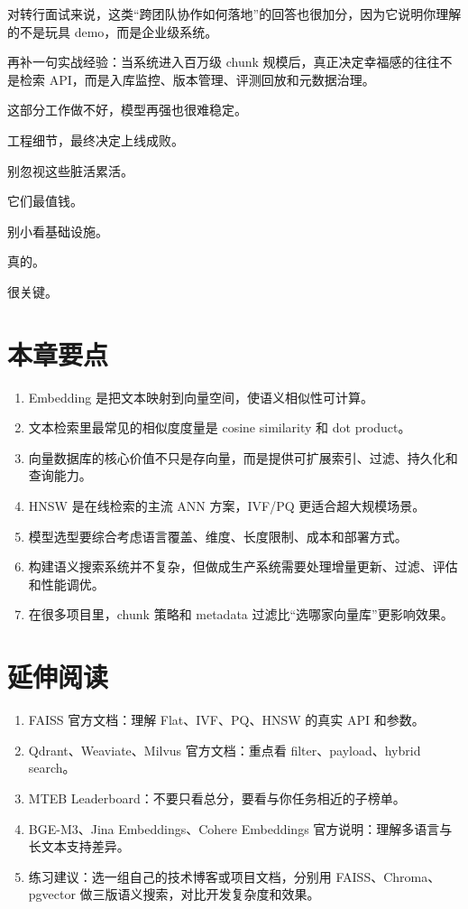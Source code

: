 对转行面试来说，这类``跨团队协作如何落地''的回答也很加分，因为它说明你理解的不是玩具 demo，而是企业级系统。

再补一句实战经验：当系统进入百万级 chunk 规模后，真正决定幸福感的往往不是检索 API，而是入库监控、版本管理、评测回放和元数据治理。

这部分工作做不好，模型再强也很难稳定。

工程细节，最终决定上线成败。

别忽视这些脏活累活。

它们最值钱。

别小看基础设施。

真的。

很关键。


\section{本章要点}

\begin{enumerate}[leftmargin=2em]
\item Embedding 是把文本映射到向量空间，使语义相似性可计算。
\item 文本检索里最常见的相似度度量是 cosine similarity 和 dot product。
\item 向量数据库的核心价值不只是存向量，而是提供可扩展索引、过滤、持久化和查询能力。
\item HNSW 是在线检索的主流 ANN 方案，IVF/PQ 更适合超大规模场景。
\item 模型选型要综合考虑语言覆盖、维度、长度限制、成本和部署方式。
\item 构建语义搜索系统并不复杂，但做成生产系统需要处理增量更新、过滤、评估和性能调优。
\item 在很多项目里，chunk 策略和 metadata 过滤比``选哪家向量库''更影响效果。
\end{enumerate}

\section{延伸阅读}

\begin{enumerate}[leftmargin=2em]
\item FAISS 官方文档：理解 Flat、IVF、PQ、HNSW 的真实 API 和参数。
\item Qdrant、Weaviate、Milvus 官方文档：重点看 filter、payload、hybrid search。
\item MTEB Leaderboard：不要只看总分，要看与你任务相近的子榜单。
\item BGE-M3、Jina Embeddings、Cohere Embeddings 官方说明：理解多语言与长文本支持差异。
\item 练习建议：选一组自己的技术博客或项目文档，分别用 FAISS、Chroma、pgvector 做三版语义搜索，对比开发复杂度和效果。
\end{enumerate}
